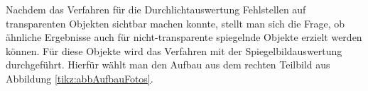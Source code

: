 Nachdem das Verfahren für die Durchlichtauswertung Fehlstellen auf transparenten Objekten sichtbar machen konnte, stellt man sich die Frage, ob ähnliche Ergebnisse auch für nicht-transparente spiegelnde Objekte erzielt werden können.
Für diese Objekte wird das Verfahren mit der Spiegelbildauswertung durchgeführt.
Hierfür wählt man den Aufbau aus dem rechten Teilbild aus Abbildung \ref{tikz:abbAufbauFotos}.

